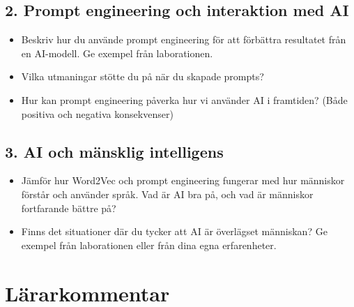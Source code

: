 \documentclass[a4paper, 12pt]{article}
\begin{document}
\subsection*{2. Prompt engineering och interaktion med AI}
\begin{itemize}
    \item Beskriv hur du använde prompt engineering för att förbättra resultatet från en AI-modell. Ge exempel från laborationen.
    \item Vilka utmaningar stötte du på när du skapade prompts? 
    \item Hur kan prompt engineering påverka hur vi använder AI i framtiden? (Både positiva och negativa konsekvenser)
\end{itemize}

\subsection*{3. AI och mänsklig intelligens}
\begin{itemize}
    \item Jämför hur Word2Vec och prompt engineering fungerar med hur människor förstår och använder språk. Vad är AI bra på, och vad är människor fortfarande bättre på?
    \item Finns det situationer där du tycker att AI är överlägset människan? Ge exempel från laborationen eller från dina egna erfarenheter.
\end{itemize}

\break

\section*{Lärarkommentar}
\end{document}
